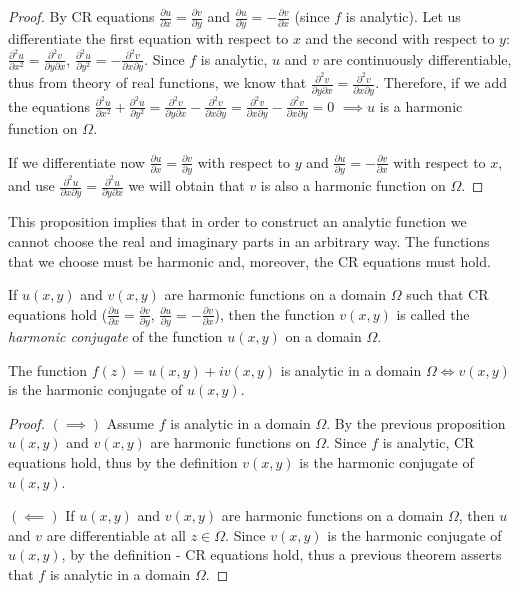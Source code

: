 \documentclass[12pt]{article}
\begin{document}
\begin{proof}
By CR equations $\frac{\partial u}{\partial x} = \frac{\partial v}{\partial y}$ and $\frac{\partial u}{\partial y} = -\frac{\partial v}{\partial x}$ (since $f$ is analytic). Let us differentiate the first equation with respect to $x$ and the second with respect to $y$:
$\frac{\partial^2 u}{\partial x^2} = \frac{\partial^2 v}{\partial y \partial x}$, $\frac{\partial^2 u}{\partial y^2} = -\frac{\partial^2 v}{\partial x \partial y}$.
Since $f$ is analytic, $u$ and $v$ are continuously differentiable, thus from theory of real functions, we know that $\frac{\partial^2 v}{\partial y \partial x} = \frac{\partial^2 v}{\partial x \partial y}$.
Therefore, if we add the equations $\frac{\partial^2 u}{\partial x^2} + \frac{\partial^2 u}{\partial y^2} = \frac{\partial^2 v}{\partial y \partial x} - \frac{\partial^2 v}{\partial x \partial y} = \frac{\partial^2 v}{\partial x \partial y} - \frac{\partial^2 v}{\partial x \partial y} = 0$
$\implies u$ is a harmonic function on $\Omega$.

If we differentiate now $\frac{\partial u}{\partial x} = \frac{\partial v}{\partial y}$ with respect to $y$ and $\frac{\partial u}{\partial y} = -\frac{\partial v}{\partial x}$ with respect to $x$, and use $\frac{\partial^2 u}{\partial x \partial y} = \frac{\partial^2 u}{\partial y \partial x}$ we will obtain that $v$ is also a harmonic function on $\Omega$.
\end{proof}

This proposition implies that in order to construct an analytic function we cannot choose the real and imaginary parts in an arbitrary way. The functions that we choose must be harmonic and, moreover, the CR equations must hold.

\begin{definition}
If $u(x,y)$ and $v(x,y)$ are harmonic functions on a domain $\Omega$ such that CR equations hold ($\frac{\partial u}{\partial x} = \frac{\partial v}{\partial y}$, $\frac{\partial u}{\partial y} = -\frac{\partial v}{\partial x}$), then the function $v(x,y)$ is called the \emph{harmonic conjugate} of the function $u(x,y)$ on a domain $\Omega$.
\end{definition}

\begin{proposition}
The function $f(z) = u(x,y) + iv(x,y)$ is analytic in a domain $\Omega \iff v(x,y)$ is the harmonic conjugate of $u(x,y)$.
\end{proposition}

\begin{proof}
$(\implies)$ Assume $f$ is analytic in a domain $\Omega$. By the previous proposition $u(x,y)$ and $v(x,y)$ are harmonic functions on $\Omega$. Since $f$ is analytic, CR equations hold, thus by the definition $v(x,y)$ is the harmonic conjugate of $u(x,y)$.

$(\impliedby)$ If $u(x,y)$ and $v(x,y)$ are harmonic functions on a domain $\Omega$, then $u$ and $v$ are differentiable at all $z \in \Omega$. Since $v(x,y)$ is the harmonic conjugate of $u(x,y)$, by the definition - CR equations hold, thus a previous theorem asserts that $f$ is analytic in a domain $\Omega$.
\end{proof}
\end{document}
